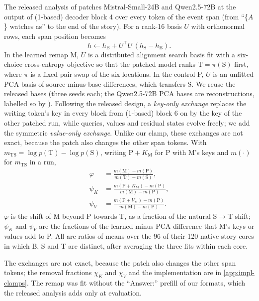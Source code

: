The released analysis of \citet{anonymous2026fitted} patches Mistral-Small-24B and Qwen2.5-72B at the output of (1-based) decoder block 4 over every token of the event span (from ``\{$A$\} watches as'' to the end of the story). For a rank-16 basis $U$ with orthonormal rows, each span position becomes
\begin{equation}\label{eq:patch}
h \leftarrow h_{\mathrm{B}} + U^{\top} U\,(h_{\mathrm{S}} - h_{\mathrm{B}}).
\end{equation}
In the learned remap M, $U$ is a distributed alignment search basis \citep{geiger2024finding} fit with a six-choice cross-entropy objective so that the patched model ranks $\mathrm{T} = \pi(\mathrm{S})$ first, where $\pi$ is a fixed pair-swap of the six locations. In the control P, $U$ is an unfitted PCA basis of source-minus-base differences, which transfers S. We reuse the released bases (three seeds each; the Qwen2.5-72B PCA bases are reconstructions, labelled so by \citet{anonymous2026fitted}). Following the released design, a \emph{key-only exchange} replaces the writing token's key in every block from (1-based) block 6 on by the key of the other patched run, while queries, values and residual states evolve freely; we add the symmetric \emph{value-only exchange}. Unlike our clamp, these exchanges are not exact, because the patch also changes the other span tokens. With $m_{\mathrm{TS}} = \log p(\mathrm{T}) - \log p(\mathrm{S})$, writing $\mathrm{P}{+}K_{\mathrm{M}}$ for P with M's keys and $m(\cdot)$ for $m_{\mathrm{TS}}$ in a run,
\begin{align}
\varphi &= \frac{m(\mathrm{M}) - m(\mathrm{P})}{m(\mathrm{T}) - m(\mathrm{S})}, \label{eq:phi}\\
\psi_K &= \frac{m(\mathrm{P}{+}K_{\mathrm{M}}) - m(\mathrm{P})}{m(\mathrm{M}) - m(\mathrm{P})}, \label{eq:psik}\\
\psi_V &= \frac{m(\mathrm{P}{+}V_{\mathrm{M}}) - m(\mathrm{P})}{m(\mathrm{M}) - m(\mathrm{P})}. \label{eq:psiv}
\end{align}
$\varphi$ is the shift of M beyond P towards T, as a fraction of the natural S$\to$T shift; $\psi_K$ and $\psi_V$ are the fractions of the learned-minus-PCA difference that M's keys or values add to P. All are ratios of means over the 96 of their 120 native story cores in which B, S and T are distinct, after averaging the three fits within each core.

The exchanges are not exact, because the patch also changes the other span tokens; the removal fractions $\chi_K$ and $\chi_V$ and the implementation are in \cref{app:impl-clamps}. The remap was fit without the ``Answer:'' prefill of our formats, which the released analysis adds only at evaluation.

